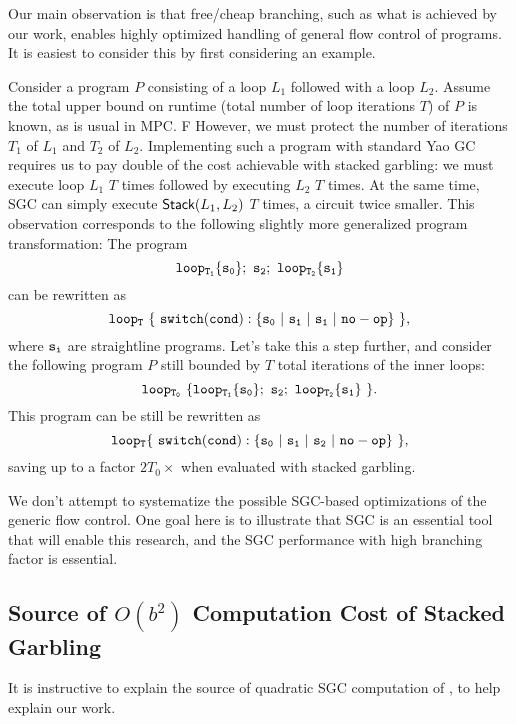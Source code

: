 Our main observation is that free/cheap branching, such as what is achieved by our work, enables highly optimized handling of general flow control of programs. It is easiest to consider this by first considering an example.

Consider a program $P$ consisting of a loop $L_1$ followed with a loop $L_2$.  Assume the total upper bound on runtime (total number of loop iterations $T$) of $P$ is known, as is usual in MPC. F However, we must protect the number of iterations $T_1$ of $L_1$ and $T_2$ of $L_2$. Implementing such a program with standard Yao GC requires us to pay double of the cost achievable with stacked garbling: we must execute loop $L_1$ $T$ times followed by executing $L_2$ $T$ times.  At the same time, SGC can simply execute  $\textsf{Stack}(L_1, L_2)$ $T$ times, a circuit twice smaller.  This observation corresponds to the following slightly more generalized program transformation: The program 
\[{\tt loop_{T_1} \{ s_0 \} ; \ s_2;\ loop_{T_2} \{ s_1 \}} \]
can be rewritten as 
\[ {\tt loop_T\ \{\ switch  (cond):\{ s_0\ |\ s_1\ |\ s_1\ |\ \mathtt{no-op}\}\ \}}, \]
where ${\tt s_i}$ are straightline programs.
Let's take this a step further, and consider the following program $P$ still bounded by $T$ total iterations of the inner loops:
\[{\tt loop_{T_0}\ \{ loop_{T_1} \{ s_0 \};\ s_2;\  loop_{T_2} \{ s_1 \}\ \} }.\] 
This program can be still be rewritten as  
\[{\tt loop_{T} \{\ switch  (cond):\{ s_0\ |\ s_1\ |\ s_2\ |\ \mathtt{no-op}\}\ \}},\] 
saving up to a factor $2T_0\times$ when evaluated with stacked garbling. 

We don't attempt to systematize the possible SGC-based optimizations of the generic flow control. One goal here is to illustrate that SGC is an essential tool that will enable this research, and the SGC performance with high branching factor is essential.





 




\subsection{Source of $O(b^2)$ Computation Cost of \HK Stacked Garbling }
\label{sec:bsquaredcost}

It is instructive to explain the source of quadratic SGC computation of \HK, to help explain our work.

